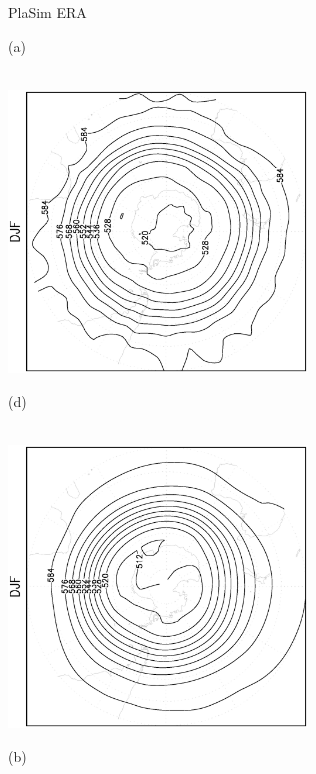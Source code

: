 \documentclass[12pt,a4paper,twoside,openright,headinclude,liststotoc,bibtotoc]{scrreprt}
\begin{document}
\begin{appendix}
\begin{figure}[c]
\hspace{3.55cm}PlaSim \vspace{0.2cm} \hspace{7.25cm} ERA \\
\parbox{8.5cm}{\hspace{0.90cm}\begin{scriptsize}(a) \end{scriptsize} \vspace{-0.5cm} \\
\includegraphics[height=7.5cm,angle=-90]
{eps/southcircysmz500DJF.eps}
}
\parbox{8.5cm}{\hspace{0.90cm}\begin{scriptsize}(d) \end{scriptsize} \vspace{-0.5cm} \\
\includegraphics[height=7.5cm,angle=-90]
{eps/southcirct21ysmz500DJF.eps}
}
\parbox{8.5cm}{\hspace{0.80cm} \begin{scriptsize}(b) \end{scriptsize} \vspace{-0.5cm} \\
}
\end{figure}
\end{appendix}
\end{document}

